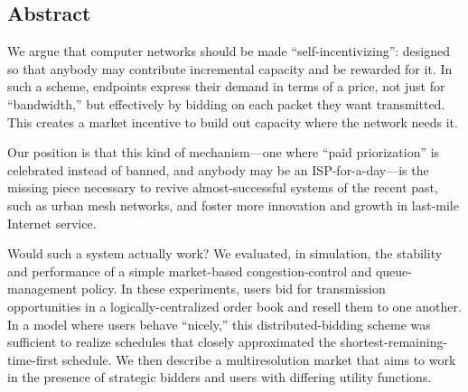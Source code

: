 \subsection*{Abstract}
We argue that computer networks should be made ``self-incentivizing'':
designed so that anybody may contribute incremental capacity and be
rewarded for it. In such a scheme, endpoints express their demand in
terms of a price, not just for ``bandwidth,'' but effectively by
bidding on each packet they want transmitted. This creates a market
incentive to build out capacity where the network needs it.

Our position is that this kind of mechanism---one where ``paid
priorization'' is celebrated instead of banned, and anybody may be an
ISP-for-a-day---is the missing piece necessary to revive
almost-successful systems of the recent past, such as urban mesh
networks, and foster more innovation and growth in last-mile Internet service.

Would such a system actually work? We evaluated, in simulation, the
stability and performance of a simple market-based congestion-control and queue-management
policy. In these experiments, users bid for
transmission opportunities in a logically-centralized order book and
resell them to one another. In a model where users behave ``nicely,''
this distributed-bidding scheme was sufficient to realize schedules
that closely approximated the shortest-remaining-time-first
schedule. We then describe a multiresolution market that aims
to work in the presence of strategic bidders and users with
differing utility functions.

